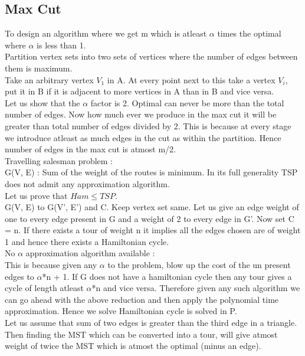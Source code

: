 \documentclass[solution,addpoints,12pt]{exam}
\begin{document}
\subsection{Max Cut}
To design an algorithm where we get m which is atleast
$\alpha$ times the optimal where $\alpha$ is less than 1.\\
Partition vertex sets into two sets of vertices where the
number of edges between them is maximum.\\

Take an arbitrary vertex $V_1$ in A. At every point
next to this take a vertex $V_i$, put it in B if it is adjacent
to more vertices in A than in B and vice versa.\\
Let us show that the $\alpha$ factor is 2. Optimal can never
be more than the total number of edges. Now
how much ever we produce in the max cut it will be greater than
total number of edges divided by 2. This is because at every
stage we introduce atleast as much edges in the cut as within
the partition. Hence number of edges in the max cut is atmost
m/2.\\

Travelling salesman problem :\\
G(V, E) : Sum of the weight of the routes is minimum.
In its full generality TSP does not admit any approximation
algorithm.\\
Let us prove that $Ham \le TSP$.\\
G(V, E) to G(V', E') and C.
Keep vertex set same. Let us give an edge weight of one
to every edge present in G and a weight of 2 to every edge
in G'. Now set C = n. If there exists a tour of weight n
it implies all the edges chosen are of weight 1 and hence there
exists a Hamiltonian cycle.\\

No $\alpha$ approximation algorithm available :\\
This is because given any $\alpha$ to the problem, blow up
the cost of the un present edges to $\alpha$*n + 1. If G
does not have a hamiltonian cycle then any tour gives
a cycle of length atleast $\alpha$*n and vice versa. Therefore
given any such algorithm we can go ahead with the above reduction
and then apply the polynomial time approximation. Hence we solve
Hamiltonian cycle is solved in P.\\

Let us assume that sum of two edges is greater than the third
edge in a triangle. Then finding the MST which can be converted into
a tour, will give atmost weight of twice the MST which is atmost
the optimal (minus an edge).\\
\end{document}
